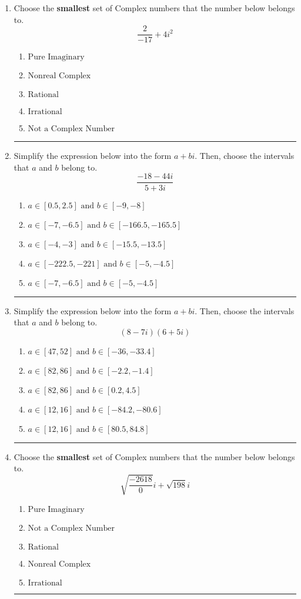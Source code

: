 \documentclass[14pt]{extbook}
\newcommand{\litem}[1]{\item#1\hspace*{-1cm}\rule{\textwidth}{0.4pt}}
\begin{document}
\begin{enumerate}
\litem{
Choose the \textbf{smallest} set of Complex numbers that the number below belongs to.\[ \frac{2}{-17}+4i^2 \]\begin{enumerate}[label=\Alph*.]
\item \( \text{Pure Imaginary} \)
\item \( \text{Nonreal Complex} \)
\item \( \text{Rational} \)
\item \( \text{Irrational} \)
\item \( \text{Not a Complex Number} \)

\end{enumerate} }
\litem{
Simplify the expression below into the form $a+bi$. Then, choose the intervals that $a$ and $b$ belong to.\[ \frac{-18 - 44 i}{5 + 3 i} \]\begin{enumerate}[label=\Alph*.]
\item \( a \in [0.5, 2.5] \text{ and } b \in [-9, -8] \)
\item \( a \in [-7, -6.5] \text{ and } b \in [-166.5, -165.5] \)
\item \( a \in [-4, -3] \text{ and } b \in [-15.5, -13.5] \)
\item \( a \in [-222.5, -221] \text{ and } b \in [-5, -4.5] \)
\item \( a \in [-7, -6.5] \text{ and } b \in [-5, -4.5] \)

\end{enumerate} }
\litem{
Simplify the expression below into the form $a+bi$. Then, choose the intervals that $a$ and $b$ belong to.\[ (8 - 7 i)(6 + 5 i) \]\begin{enumerate}[label=\Alph*.]
\item \( a \in [47, 52] \text{ and } b \in [-36, -33.4] \)
\item \( a \in [82, 86] \text{ and } b \in [-2.2, -1.4] \)
\item \( a \in [82, 86] \text{ and } b \in [0.2, 4.5] \)
\item \( a \in [12, 16] \text{ and } b \in [-84.2, -80.6] \)
\item \( a \in [12, 16] \text{ and } b \in [80.5, 84.8] \)

\end{enumerate} }
\litem{
Choose the \textbf{smallest} set of Complex numbers that the number below belongs to.\[ \sqrt{\frac{-2618}{0}} i+\sqrt{198}i \]\begin{enumerate}[label=\Alph*.]
\item \( \text{Pure Imaginary} \)
\item \( \text{Not a Complex Number} \)
\item \( \text{Rational} \)
\item \( \text{Nonreal Complex} \)
\item \( \text{Irrational} \)


\end{enumerate}}
\end{enumerate}
\end{document}
